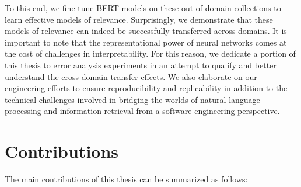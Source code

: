 To this end, we fine-tune BERT models on these out-of-domain collections to learn effective models of relevance.
Surprisingly, we demonstrate that these models of relevance can indeed be successfully transferred across domains.
It is important to note that the representational power of neural networks comes at the cost of challenges in interpretability.
For this reason, we dedicate a portion of this thesis to error analysis experiments in an attempt to qualify and better understand the cross-domain transfer effects.
We also elaborate on our engineering efforts to ensure reproducibility and replicability in addition to the technical challenges involved in bridging the worlds of natural language processing and information retrieval from a software engineering perspective.

\newpage

\section{Contributions}

The main contributions of this thesis can be summarized as follows:\\

